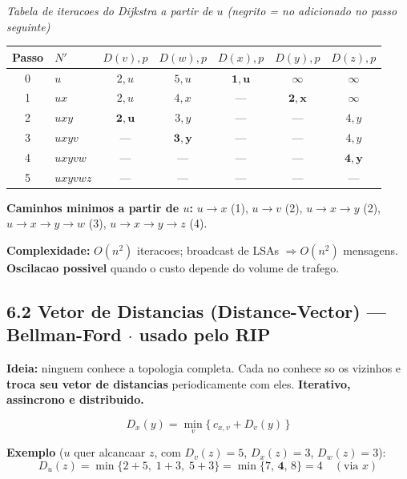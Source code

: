 \documentclass[11pt,a4paper]{article}
\begin{document}
\begin{explicacao}
\begin{center}
{\small\textit{Tabela de iteracoes do Dijkstra a partir de $u$ (negrito = no adicionado no passo seguinte)}}\\[4pt]
\begin{tabular}{cl ccccc}
\toprule
\textbf{Passo} & $N'$ & $D(v),p$ & $D(w),p$ & $D(x),p$ & $D(y),p$ & $D(z),p$ \\
\midrule
0 & $u$      & $2,u$          & $5,u$          & $\mathbf{1,u}$ & $\infty$       & $\infty$       \\
1 & $ux$     & $2,u$          & $4,x$          & ---            & $\mathbf{2,x}$ & $\infty$       \\
2 & $uxy$    & $\mathbf{2,u}$ & $3,y$          & ---            & ---            & $4,y$          \\
3 & $uxyv$   & ---            & $\mathbf{3,y}$ & ---            & ---            & $4,y$          \\
4 & $uxyvw$  & ---            & ---            & ---            & ---            & $\mathbf{4,y}$ \\
5 & $uxyvwz$ & ---            & ---            & ---            & ---            & ---            \\
\bottomrule
\end{tabular}
\end{center}

\textbf{Caminhos minimos a partir de $u$:}
$u{\to}x$ (1),\; $u{\to}v$ (2),\; $u{\to}x{\to}y$ (2),\; $u{\to}x{\to}y{\to}w$ (3),\; $u{\to}x{\to}y{\to}z$ (4).

\medskip
\textbf{Complexidade:} $O(n^2)$ iteracoes; broadcast de LSAs $\Rightarrow O(n^2)$ mensagens. \textbf{Oscilacao possivel} quando o custo depende do volume de trafego.

\subsection*{6.2 Vetor de Distancias (Distance-Vector) --- Bellman-Ford $\cdot$ usado pelo RIP}

\textbf{Ideia:} ninguem conhece a topologia completa. Cada no conhece so os vizinhos e \textbf{troca seu vetor de distancias} periodicamente com eles. \textbf{Iterativo, assincrono e distribuido.}

\[
D_x(y) = \min_{v}\bigl\{\, c_{x,v} + D_v(y) \,\bigr\}
\]

\textbf{Exemplo} ($u$ quer alcancaar $z$, com $D_v(z)=5$, $D_x(z)=3$, $D_w(z)=3$):
\[
D_u(z) = \min\{2+5,\; 1+3,\; 5+3\} = \min\{7,\,\mathbf{4},\,8\} = 4 \quad(\text{via } x)
\]


\end{explicacao}
\end{document}
